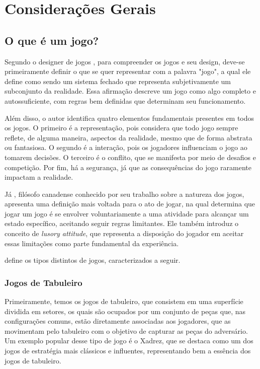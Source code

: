 \chapter{Considerações Gerais}
\label{cap:02}

\section{O que é um jogo?}

Segundo o designer de jogos , para compreender os jogos e seu design, deve-se primeiramente definir o que se quer representar com a palavra "jogo", a qual ele define como sendo um sistema fechado que representa subjetivamente um subconjunto da realidade. Essa afirmação descreve um jogo como algo completo e autossuficiente, com regras bem definidas que determinam seu funcionamento.

Além disso, o autor identifica quatro elementos fundamentais presentes em todos os jogos. O primeiro é a representação, pois considera que todo jogo sempre reflete, de alguma maneira, aspectos da realidade, mesmo que de forma abstrata ou fantasiosa. O segundo é a interação, pois os jogadores influenciam o jogo ao tomarem decisões. O terceiro é o conflito, que se manifesta por meio de desafios e competição. Por fim, há a segurança, já que as consequências do jogo raramente impactam a realidade.


Já , filósofo canadense conhecido por seu trabalho sobre a natureza dos jogos, apresenta uma definição mais voltada para o ato de jogar, na qual determina que jogar um jogo é se envolver voluntariamente a uma atividade para alcançar um estado específico, aceitando seguir regras limitantes. Ele também introduz o conceito de \textit{lusory attitude}, que representa a disposição do jogador em aceitar essas limitações como parte fundamental da experiência.



 define os tipos distintos de jogos, caracterizados a seguir.



\subsection{Jogos de Tabuleiro}

Primeiramente, temos os jogos de tabuleiro, que consistem em uma superfície dividida em setores, os quais são ocupados por um conjunto de peças que, nas configurações comuns, estão diretamente associadas aos jogadores, que as movimentam pelo tabuleiro com o objetivo de capturar as peças do adversário. Um exemplo popular desse tipo de jogo é o Xadrez, que se destaca como um dos jogos de estratégia mais clássicos e influentes, representando bem a essência dos jogos de tabuleiro.

